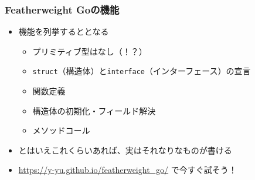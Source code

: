 \begin{frame}[fragile]
  \frametitle{Featherweight Goの機能}

  \pause
  \begin{itemize}
    \item<+-> 機能を列挙するととなる
    \begin{itemize}
      \item プリミティブ型はなし（！？）

      \item \lstinline|struct|（構造体）と\lstinline|interface|（インターフェース）の宣言

      \item 関数定義

      \item 構造体の初期化・フィールド解決

      \item メソッドコール
    \end{itemize}


    \item<+-> とはいえこれくらいあれば、実はそれなりなものが書ける

    \item<+-> \url{https://y-yu.github.io/featherweight_go/}
    で今すぐ試そう！
  \end{itemize}
\end{frame}


